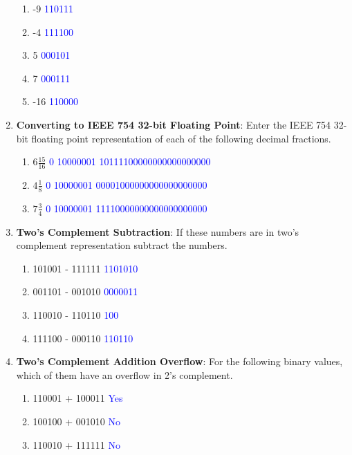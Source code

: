 \documentclass{article}
\begin{document}
\begin{enumerate}[label=(\alph*)]
    \begin{enumerate}[label=(\roman*)]
        \item -9 \textcolor{blue}{110111}
        \item -4 \textcolor{blue}{111100}
        \item 5 \textcolor{blue}{000101}
        \item 7 \textcolor{blue}{000111}
        \item -16 \textcolor{blue}{110000}
    \end{enumerate}
    \item \textbf{Converting to IEEE 754 32-bit Floating Point}: Enter the IEEE 754 32-bit floating point representation of each of the following decimal fractions.
    \begin{enumerate}[label=(\roman*)]
        \item $6 \frac{15}{16}$ \textcolor{blue}{0 10000001 10111100000000000000000}
        \item $4 \frac{1}{8}$ \textcolor{blue}{0 10000001 00001000000000000000000}
        \item $7 \frac{3}{4}$ \textcolor{blue}{0 10000001 11110000000000000000000}
    \end{enumerate}
    \item \textbf{Two's Complement Subtraction}: If these numbers are in two’s complement representation subtract the numbers.
    \begin{enumerate}[label=(\roman*)]
        \item 101001 - 111111 \textcolor{blue}{1101010}
        \item 001101 - 001010 \textcolor{blue}{0000011}
        \item 110010 - 110110 \textcolor{blue}{100}
        \item 111100 - 000110 \textcolor{blue}{110110}
    \end{enumerate}
    \item \textbf{Two's Complement Addition Overflow}: For the following binary values, which of them have an overflow in 2’s complement.
    \begin{enumerate}[label=(\roman*)]
        \item 110001 + 100011 \textcolor{blue}{Yes}
        \item 100100 + 001010 \textcolor{blue}{No}
        \item 110010 + 111111 \textcolor{blue}{No}
    \end{enumerate}
\end{enumerate}
\newpage
\end{document}
